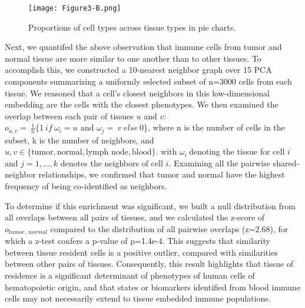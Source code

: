\begin{figure}
\centering
\texttt{[image: Figure3-B.png]}
\caption{Proportions of cell types across tissue types in pie charts.}
\label{fig:3b}
\end{figure}

Next, we quantifed the above observation that immune cells from tumor and normal tissue are more similar to one another than to other tissues.
To accomplish this, we constructed a 10-nearest neighbor graph over 15 PCA components summarizing a uniformly selected subset of n=3000 cells from each tissue.
We reasoned that a cell's closest neighbors in this low-dimensional embedding are the cells with the closest phenotypes. 
We then examined the overlap between each pair of tissues $u$ and $v$: 
\(o_{u,v} = \ \frac{1}{n}\{ 1\ if\ {\omega_{i} = u}_{}\text{\ and\ }\omega_{j} = \ v_{}\ else\ 0\}\), where n is the number of cells in the subset, k is the number of neighbors, and $u, v \in \{\text{tumor}, \text{normal}, \text{lymph node}, \text{blood}\}$.
with \(\omega_{i}\ \)denoting the tissue for cell \(i\) and \(j = 1,\ldots,k\) denotes the neighbors of cell \(i\). 
Examining all the pairwise shared-neighbor relationships, we confirmed that tumor and normal have the highest frequency of being co-identified as neighbors. 


To determine if this enrichment was significant, we built a null distribution from all overlaps between all pairs of tissues, and we calculated the z-score of \(o_{tumor,\ normal}\) compared to the distribution of all pairwise overlaps (z=2.68), for which a z-test confers a p-value of p=1.4e-4.
This suggests that similarity between tissue resident cells is a positive outlier, compared with similarities between other pairs of tissues. 
Consequently, this result highlights that tissue of residence is a significant determinant of phenotypes of human cells of hematopoietic origin, and that states or biomarkers identified from blood immune cells may not necessarily extend to tissue embedded immune populations.

